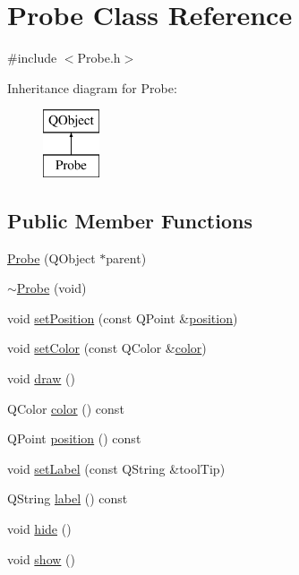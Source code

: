 \hypertarget{class_probe}{\section{Probe Class Reference}
\label{class_probe}
}


{\ttfamily \#include $<$Probe.\+h$>$}

Inheritance diagram for Probe\+:\begin{figure}[H]
\begin{center}
\leavevmode
\includegraphics[height=2.000000cm]{class_probe}
\end{center}
\end{figure}
\subsection*{Public Member Functions}
\begin{DoxyCompactItemize}
\item 
\hyperlink{class_probe_a0c7c763cf0745c6a53cb1db579380e73}{Probe} (Q\+Object $\ast$parent)
\item 
\hyperlink{class_probe_a0bfeef911e78cd2ebc151da41a458f60}{$\sim$\+Probe} (void)
\item 
void \hyperlink{class_probe_add01ac928a09ba40f01bee3d2ffd8848}{set\+Position} (const Q\+Point \&\hyperlink{class_probe_afd206513c738cc239a95bad59445e998}{position})
\item 
void \hyperlink{class_probe_a00c9f00f28d8dd724ee21f9a4462e015}{set\+Color} (const Q\+Color \&\hyperlink{class_probe_a3b43c9b49f2672a7b0dd72bac25aab5c}{color})
\item 
void \hyperlink{class_probe_a1732d34c1e5b02e12b7ec405d144190f}{draw} ()
\item 
Q\+Color \hyperlink{class_probe_a3b43c9b49f2672a7b0dd72bac25aab5c}{color} () const 
\item 
Q\+Point \hyperlink{class_probe_afd206513c738cc239a95bad59445e998}{position} () const 
\item 
void \hyperlink{class_probe_a2cad80c5851ce1ab165f41e56075853d}{set\+Label} (const Q\+String \&tool\+Tip)
\item 
Q\+String \hyperlink{class_probe_aecea3294d0fc08031e3f4e58dc56e7fe}{label} () const 
\item 
void \hyperlink{class_probe_af03400f61740988afa1ea8de3c57b5a7}{hide} ()
\item 
void \hyperlink{class_probe_a740a926e11b7723f3069d163a0b44c57}{show} ()
\end{DoxyCompactItemize}
